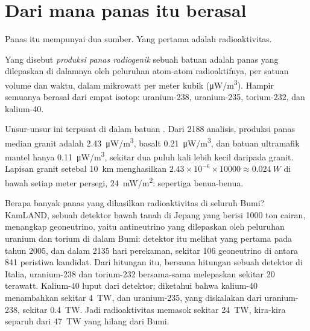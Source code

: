 \section{Dari mana panas itu berasal}

Panas itu mempunyai dua sumber. Yang pertama adalah radioaktivitas.

\begin{definition}\label{def:g12:internal-heat:heat-production}
Yang disebut \emph{produksi panas radiogenik}
sebuah batuan adalah panas yang dilepaskan di dalamnya oleh peluruhan
atom-atom radioaktifnya, per satuan volume dan waktu, dalam mikrowatt per meter
kubik (\unit{\micro W/m^3}). Hampir semuanya berasal dari empat isotop:
uranium-238, uranium-235, torium-232, dan kalium-40.
\end{definition}

Unsur-unsur ini terpusat di dalam batuan . Dari 2188 analisis,
produksi panas median granit adalah \qty{2.43}{\micro W/m^3}, basalt
\qty{0.21}{\micro W/m^3}, dan batuan ultramafik mantel hanya
\qty{0.11}{\micro W/m^3}, sekitar dua puluh kali lebih kecil daripada granit.
Lapisan granit setebal \qty{10}{km} menghasilkan
$2.43 \times 10^{-6} \times \num{10000} \approx \qty{0.024}{W}$ di bawah setiap
meter persegi, \qty{24}{mW/m^2}: sepertiga  benua-benua.

Berapa banyak panas yang dihasilkan radioaktivitas di seluruh Bumi? KamLAND,
sebuah detektor bawah tanah di Jepang yang berisi 1000 ton cairan, menangkap
geoneutrino, yaitu antineutrino yang dilepaskan oleh peluruhan uranium dan
torium di dalam Bumi: detektor itu melihat yang pertama pada tahun 2005, dan
dalam 2135 hari perekaman, sekitar 106 geoneutrino di antara 841 peristiwa
kandidat. Dari hitungan itu, bersama hitungan sebuah detektor di Italia,
uranium-238 dan torium-232 bersama-sama melepaskan sekitar 20 terawatt.
Kalium-40 luput dari detektor; diketahui bahwa kalium-40 menambahkan sekitar
\qty{4}{TW}, dan uranium-235, yang diskalakan dari uranium-238, sekitar
\qty{0.4}{TW}. Jadi radioaktivitas memasok sekitar \qty{24}{TW}, kira-kira
separuh dari \qty{47}{TW} yang hilang dari Bumi.

